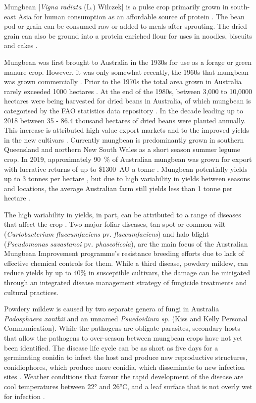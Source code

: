 \documentclass[agronomy,article,submit,moreauthors,pdftex]{mdpi}
\begin{document}

Mungbean {[}\emph{Vigna radiata} (L.) Wilczek{]} is a pulse crop
primarily grown in south-east Asia for human consumption as an
affordable source of protein \citep{Lambrides2007}. The bean pod or
grain can be consumed raw or added to meals after sprouting. The dried
grain can also be ground into a protein enriched flour for uses in
noodles, biscuits and cakes \citep{Chankaew2013}.

Mungbean was first brought to Australia in the 1930s for use as a forage
or green manure crop. However, it was only somewhat recently, the 1960s
that mungbean was grown commercially \citep{Lawn1978, Chauhan2018}.
Prior to the 1970s the total area grown in Australia rarely exceeded
1000 hectares \citep{Lawn1978}. At the end of the 1980s, between 3,000
to 10,0000 hectares were being harvested for dried beans in Australia,
of which mungbean is categorised by the FAO statistics data repository
\citep{FAOSTAT}. In the decade leading up to 2018 between 35 - 86.4
thousand hectares of dried beans were planted annually. This increase is
attributed high value export markets and to the improved yields in the
new cultivars \citep{Clarry2016}. Currently mungbean is predominantly
grown in southern Queensland and northern New South Wales as a short
season summer legume crop. In 2019, approximately 90~\% of Australian
mungbean was grown for export with lucrative returns of up to \$1300~AU
a tonne \citep{QueenslandGovernment2019}. Mungbean potentially yields up
to 3 tonnes per hectare \citep{ThomasRobert2004}, but due to high
variability in yields between seasons and locations, the average
Australian farm still yields less than 1 tonne per hectare
\citep{Chauhan2018}.

The high variability in yields, in part, can be attributed to a range of
diseases that affect the crop \citep{Kelly2017a}. Two major foliar
diseases, tan spot or common wilt (\emph{Curtobacterium flaccumfaciens}
pv. \emph{flaccumfaciens}) and halo blight (\emph{Pseudomonas
savastanoi} pv. \emph{phaseolicola}), are the main focus of the
Australian Mungbean Improvement programme's resistance breeding efforts
due to lack of effective chemical controls for them. While a third
disease, powdery mildew, can reduce yields by up to 40\%
\citep{Chankaew2013} in susceptible cultivars, the damage can be
mitigated through an integrated disease management strategy of fungicide
treatments and cultural practices.

Powdery mildew is caused by two separate genera of fungi in Australia
\emph{Podosphaera xanthii} and an unnamed \emph{Psuedoidium sp.} (Kiss
and Kelly Personal Communication). While the pathogens are obligate
parasites, secondary hosts that allow the pathogens to over-season
between mungbean crops have not yet been identified. The disease life
cycle can be as short as five days for a germinating conidia to infect
the host and produce new reproductive structures, conidiophores, which
produce more conidia, which disseminate to new infection sites
\citep{Sparks2017}. Weather conditions that favour the rapid development
of the disease are cool temperatures between 22° and 26°C, and a leaf
surface that is not overly wet for infection \citep{Kelly2017a}.
\end{document}
